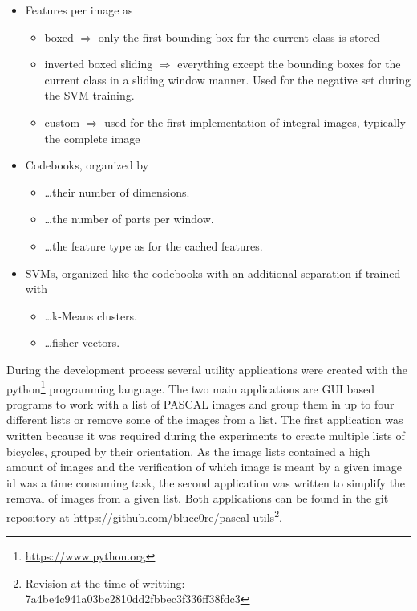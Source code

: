 \begin{itemize}
\item Features per image as
    \begin{itemize}
    \item boxed $\Rightarrow$ only the first bounding box for the current class is stored
    \item inverted boxed sliding $\Rightarrow$ everything except the bounding boxes for the current class in a sliding window manner. Used for the negative set during the \ac{SVM} training.
    \item custom $\Rightarrow$ used for the first implementation of integral images, typically the complete image
    \end{itemize}
\item Codebooks, organized by
    \begin{itemize}
    \item \dots their number of dimensions.
    \item \dots the number of parts per window.
    \item \dots the feature type as for the cached features.
    \end{itemize}
\item \acp{SVM}, organized like the codebooks with an additional separation if trained with
    \begin{itemize}
    \item \dots k-Means clusters.
    \item \dots fisher vectors.
    \end{itemize}
\end{itemize}

During the development process several utility applications were created with the python\footnote{\url{https://www.python.org}} programming language. The two main applications are \ac{GUI} based programs to work with a list of PASCAL images and group them in up to four different lists or remove some of the images from a list. The first application was written because it was required during the experiments to create multiple lists of bicycles, grouped by their orientation. As the image lists contained a high amount of images and the verification of which image is meant by a given image id was a time consuming task, the second application was written to simplify the removal of images from a given list. Both applications can be found in the git repository at \url{https://github.com/bluec0re/pascal-utils}\footnote{Revision at the time of writting: 7a4be4c941a03bc2810dd2fbbec3f336ff38fdc3}.

